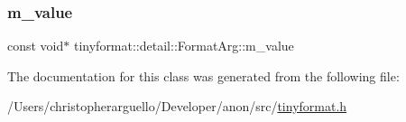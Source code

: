 \mbox{\label{classtinyformat_1_1detail_1_1_format_arg_ad7630a7d1e68ac56e46e03722156056a}} 
\subsubsection{\texorpdfstring{m\+\_\+value}{m\_value}}
{\footnotesize\ttfamily const void$\ast$ tinyformat\+::detail\+::\+Format\+Arg\+::m\+\_\+value\hspace{0.3cm}{\ttfamily [private]}}



The documentation for this class was generated from the following file\+:\begin{DoxyCompactItemize}
\item 
/\+Users/christopherarguello/\+Developer/anon/src/\mbox{\hyperlink{tinyformat_8h}{tinyformat.\+h}}\end{DoxyCompactItemize}
